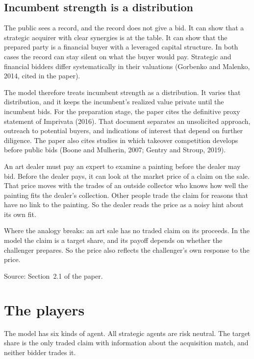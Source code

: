 \subsection*{Incumbent strength is a distribution}

The public sees a record, and the record does not give a bid.
It can show that a strategic acquirer with clear synergies is at the table.
It can show that the prepared party is a financial buyer with a leveraged capital structure.
In both cases the record can stay silent on what the buyer would pay.
Strategic and financial bidders differ systematically in their valuations (Gorbenko and Malenko, 2014, cited in the paper).

The model therefore treats incumbent strength as a distribution.
It varies that distribution, and it keeps the incumbent's realized value private until the incumbent bids.
For the preparation stage, the paper cites the definitive proxy statement of Imprivata (2016).
That document separates an unsolicited approach, outreach to potential buyers, and indications of interest that depend on further diligence.
The paper also cites studies in which takeover competition develops before public bids (Boone and Mulherin, 2007; Gentry and Stroup, 2019).

\begin{analogy}
An art dealer must pay an expert to examine a painting before the dealer may bid.
Before the dealer pays, it can look at the market price of a claim on the sale.
That price moves with the trades of an outside collector who knows how well the painting fits the dealer's collection.
Other people trade the claim for reasons that have no link to the painting.
So the dealer reads the price as a noisy hint about its own fit.

Where the analogy breaks: an art sale has no traded claim on its proceeds.
In the model the claim is a target share, and its payoff depends on whether the challenger prepares.
So the price also reflects the challenger's own response to the price.
\end{analogy}

{\small\color{notegrey}Source: Section~2.1 of the paper.}

\section{The players}\label{sec:model-players}

The model has six kinds of agent. All strategic agents are risk neutral.
The target share is the only traded claim with information about the acquisition match, and neither bidder trades it.


